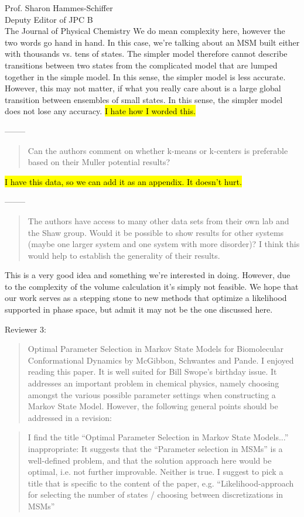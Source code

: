 \documentclass{letter}
\newcommand{\separate}{\begin{center}--------\end{center}}
\begin{document}
\begin{letter}{Prof. Sharon Hammes-Schiffer \\ Deputy Editor of JPC B \\ The Journal of Physical Chemistry}
We do mean complexity here, however the two words go hand in hand. In this case, we're talking about an MSM built either with thousands vs. tens of states. The simpler model therefore cannot describe transitions between two states from the complicated model that are lumped together in the simple model. In this sense, the simpler model is less accurate. However, this may not matter, if what you really care about is a large global transition between ensembles of small states. In this sense, the simpler model does not lose any accuracy. \hl{I hate how I worded this.}

\separate
\begin{quote}
Can the authors comment on whether k-means or k-centers is preferable based on their Muller potential results?
\end{quote}

\hl{I have this data, so we can add it as an appendix. It doesn't hurt.}

\separate
\begin{quote}
The authors have access to many other data sets from their own lab and the Shaw group.  Would it be possible to show results for other systems (maybe one larger system and one system with more disorder)?  I think this would help to establish the generality of their results.
\end{quote}

This is a very good idea and something we're interested in doing. However, due to the complexity of the volume calculation it's simply not feasible. We hope that our work serves as a stepping stone to new methods that optimize a likelihood supported in phase space, but admit it may not be the one discussed here. 


Reviewer 3:

\begin{quote}
Optimal Parameter Selection in Markov State Models for Biomolecular Conformational Dynamics by McGibbon, Schwantes and Pande. I enjoyed reading this paper. It is well suited for Bill Swope's birthday issue. It addresses an important problem in chemical physics, namely choosing amongst the various possible parameter settings when constructing a Markov State Model. However, the following general points should be addressed in a revision:
\end{quote}

\begin{quote}
I find the title “Optimal Parameter Selection in Markov State Models...” inappropriate: It suggests that the ``Parameter selection in MSMs'' is a well-defined problem, and that the solution approach here would be optimal, i.e. not further improvable. Neither is true. I suggest to pick a title that is specific to the content of the paper, e.g. ``Likelihood-approach for selecting the number of states / choosing between discretizations in MSMs''
\end{quote}


\end{letter}
\end{document}
